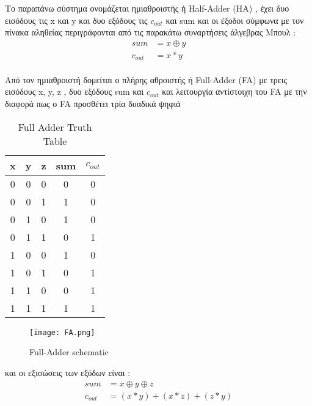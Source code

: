 Το παραπάνω σύστημα ονομάζεται ημιαθροιστής ή Half-Adder (HA) , έχει δυο εισόδους τις x και y και δυο εξόδους τις $c_{out}$ και sum και οι έξοδοι σύμφωνα με τον πίνακα αληθείας περιγράφονται από τις παρακάτω συναρτήσεις άλγεβρας Μπουλ :\\
\begin{equation}
\begin{split}
    sum &= x \oplus y \\ 
    c_{out} &= x * y
\end{split}
\end{equation}\\



Από τον ημιαθροιστή δομείται ο πλήρης αθροιστής ή Full-Adder (FA) με τρεις εισόδους x, y, z , δυο εξόδους sum και $c_{out}$ και λειτουργία αντίστοιχη του FA με την διαφορά πως ο FA προσθέτει τρία δυαδικά ψηφιά \\
\begin{multicols}{2}
\begin{table}[H]
\centering
 \begin{tabular}{||c c c | c c||} 
 \hline
 x & y & z & sum & $c_{out}$ \\ [0.5ex] 
 \hline\hline
 0 & 0 & 0 & 0 & 0 \\ 
 \hline
 0 & 0 & 1 & 1 & 0 \\
 \hline
 0 & 1 & 0 & 1 & 0 \\
 \hline
 0 & 1 & 1 & 0 & 1 \\
 \hline
 1 & 0 & 0 & 1 & 0 \\ 
 \hline
 1 & 0 & 1 & 0 & 1 \\
 \hline
 1 & 1 & 0 & 0 & 1 \\
 \hline
 1 & 1 & 1 & 1 & 1 \\
 \hline
\end{tabular}
\caption{Full Adder Truth Table}
\label{table:2}
\end{table}
\begin{figure}[H]
\centering
\texttt{[image: FA.png]}
\caption{Full-Adder schematic}
\label{FASchematic}
\end{figure}
\end{multicols}
και οι εξισώσεις των εξόδων είναι :
\begin{equation}
\begin{split}
    sum &= x \oplus y \oplus z \\
    c_{out} &= ( x * y ) + ( x * z ) + ( z * y )
\end{split}
\end{equation}





